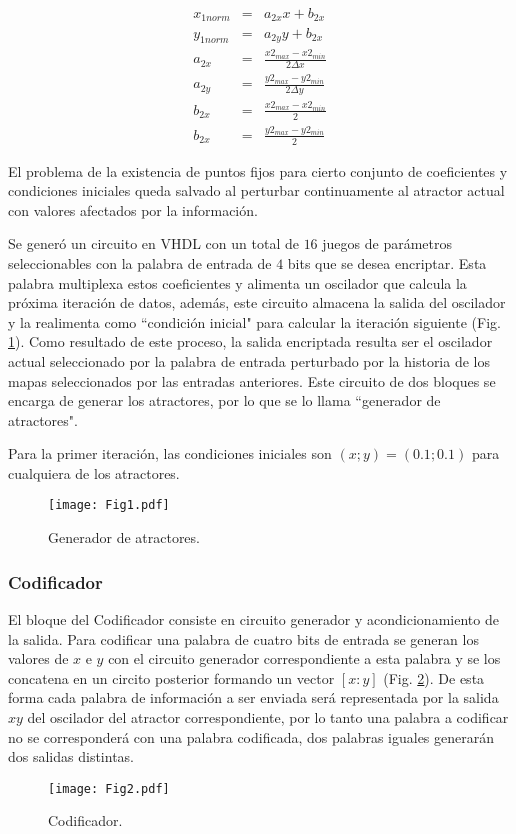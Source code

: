 %
\begin{eqnarray}\label{eq:norm_entrada}
x_{1norm}&=& a_{2x} x+b_{2x} \nonumber\\
y_{1norm}&=& a_{2y} y+b_{2x} \nonumber\\
a_{2x}&=& \frac{x2_{max}-x2_{min}}{2\Delta x} \nonumber\\
a_{2y}&=& \frac{y2_{max}-y2_{min}}{2\Delta y} \nonumber\\
b_{2x}&=& \frac{x2_{max}-x2_{min}}{2} \nonumber\\
b_{2x}&=& \frac{y2_{max}-y2_{min}}{2}
\end{eqnarray}

El problema de la existencia de puntos fijos para cierto conjunto de coeficientes y condiciones iniciales queda salvado al perturbar continuamente al atractor actual con valores afectados por la información.

Se generó un circuito en VHDL con un total de $16$ juegos de parámetros seleccionables con la palabra de entrada de $4$ bits que se desea encriptar.
Esta palabra multiplexa estos coeficientes y alimenta un oscilador que calcula la próxima iteración de datos, además, este circuito almacena la salida del oscilador y la realimenta como ``condición inicial" para calcular la iteración siguiente (Fig. \ref{fig:generador}).
Como resultado de este proceso, la salida encriptada resulta ser el oscilador actual seleccionado por la palabra de entrada perturbado por la historia de los mapas seleccionados por las entradas anteriores.
Este circuito de dos bloques se encarga de generar los atractores, por lo que se lo llama ``generador de atractores".

Para la primer iteración, las condiciones iniciales son $(x;y)=(0.1;0.1)$ para cualquiera de los atractores.
%
\begin{figure}
    \centering
    \texttt{[image: Fig1.pdf]}\\
    \caption{Generador de atractores.}\label{fig:generador}
\end{figure}

\subsubsection{Codificador}
El bloque del Codificador consiste en circuito generador y acondicionamiento de la salida.
Para codificar una palabra de cuatro bits de entrada se generan los valores de $x$ e $y$ con el circuito generador correspondiente a esta palabra y se los concatena en un circito posterior formando un vector $[x:y]$ (Fig. \ref{fig:codificador}).
De esta forma cada palabra de información a ser enviada será representada por la salida $xy$  del oscilador del atractor correspondiente, por lo tanto una palabra a codificar no se corresponderá con una palabra codificada, dos palabras iguales generarán dos salidas distintas.
%
\begin{figure}
    \centering
    \texttt{[image: Fig2.pdf]}\\
    \caption{Codificador.}\label{fig:codificador}
\end{figure}

